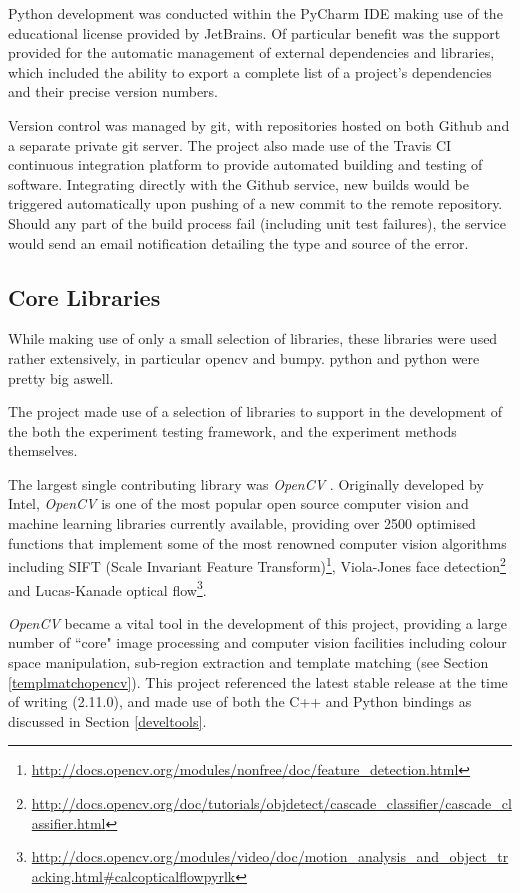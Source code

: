 Python development was conducted within the PyCharm IDE making use of the educational license provided by JetBrains. Of particular benefit was the support provided for the automatic management of external dependencies and libraries, which included the ability to export a complete list of a project's dependencies and their precise version numbers.

Version control was managed by git, with repositories hosted on both Github and a separate private git server. The project also made use of the Travis CI continuous integration platform to provide automated building and testing of software. Integrating directly with the Github service, new builds would be triggered automatically upon pushing of a new commit to the remote repository. Should any part of the build process fail (including unit test failures), the service would send an email notification detailing the type and source of the error.  

\subsection{Core Libraries}

While making use of only a small selection of libraries, these libraries were used rather extensively, in particular opencv and bumpy. python and python were pretty big aswell.

The project made use of a selection of libraries to support in the development of the both the experiment testing framework, and the experiment methods themselves.

The largest single contributing library was \textit{OpenCV} \cite{opencv}. Originally developed by Intel, \textit{OpenCV} is one of the most popular open source computer vision and machine learning libraries currently available, providing over 2500 optimised functions that implement some of the most renowned computer vision algorithms including SIFT (Scale Invariant Feature Transform)\footnote{\url{http://docs.opencv.org/modules/nonfree/doc/feature_detection.html}}, Viola-Jones face detection\footnote{\url{http://docs.opencv.org/doc/tutorials/objdetect/cascade_classifier/cascade_classifier.html}} and Lucas-Kanade optical flow\footnote{\url{http://docs.opencv.org/modules/video/doc/motion_analysis_and_object_tracking.html#calcopticalflowpyrlk}}. 

\textit{OpenCV} became a vital tool in the development of this project, providing a large number of ``core" image processing and computer vision facilities including colour space manipulation, sub-region extraction and template matching (see Section \ref{templmatchopencv}). This project referenced the latest stable release at the time of writing (2.11.0), and made use of both the C++ and Python bindings as discussed in Section \ref{develtools}.

